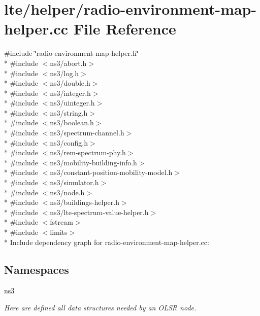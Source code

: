 \hypertarget{radio-environment-map-helper_8cc}{}\section{lte/helper/radio-\/environment-\/map-\/helper.cc File Reference}
\label{radio-environment-map-helper_8cc}
{\ttfamily \#include \char`\"{}radio-\/environment-\/map-\/helper.\+h\char`\"{}}\\*
{\ttfamily \#include $<$ns3/abort.\+h$>$}\\*
{\ttfamily \#include $<$ns3/log.\+h$>$}\\*
{\ttfamily \#include $<$ns3/double.\+h$>$}\\*
{\ttfamily \#include $<$ns3/integer.\+h$>$}\\*
{\ttfamily \#include $<$ns3/uinteger.\+h$>$}\\*
{\ttfamily \#include $<$ns3/string.\+h$>$}\\*
{\ttfamily \#include $<$ns3/boolean.\+h$>$}\\*
{\ttfamily \#include $<$ns3/spectrum-\/channel.\+h$>$}\\*
{\ttfamily \#include $<$ns3/config.\+h$>$}\\*
{\ttfamily \#include $<$ns3/rem-\/spectrum-\/phy.\+h$>$}\\*
{\ttfamily \#include $<$ns3/mobility-\/building-\/info.\+h$>$}\\*
{\ttfamily \#include $<$ns3/constant-\/position-\/mobility-\/model.\+h$>$}\\*
{\ttfamily \#include $<$ns3/simulator.\+h$>$}\\*
{\ttfamily \#include $<$ns3/node.\+h$>$}\\*
{\ttfamily \#include $<$ns3/buildings-\/helper.\+h$>$}\\*
{\ttfamily \#include $<$ns3/lte-\/spectrum-\/value-\/helper.\+h$>$}\\*
{\ttfamily \#include $<$fstream$>$}\\*
{\ttfamily \#include $<$limits$>$}\\*
Include dependency graph for radio-\/environment-\/map-\/helper.cc\+:
\subsection*{Namespaces}
\begin{DoxyCompactItemize}
\item 
 \hyperlink{namespacens3}{ns3}
\begin{DoxyCompactList}\small\item\em Here are defined all data structures needed by an O\+L\+SR node. \end{DoxyCompactList}\end{DoxyCompactItemize}
